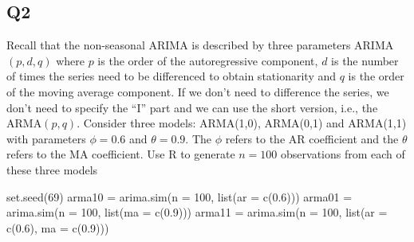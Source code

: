 \documentclass[
]{article}
\newenvironment{Shaded}{\begin{snugshade}}{\end{snugshade}}
\newcommand{\AttributeTok}[1]{\textcolor[rgb]{0.77,0.63,0.00}{#1}}
\newcommand{\DecValTok}[1]{\textcolor[rgb]{0.00,0.00,0.81}{#1}}
\newcommand{\FloatTok}[1]{\textcolor[rgb]{0.00,0.00,0.81}{#1}}
\newcommand{\FunctionTok}[1]{\textcolor[rgb]{0.00,0.00,0.00}{#1}}
\newcommand{\NormalTok}[1]{#1}
\newcommand{\OtherTok}[1]{\textcolor[rgb]{0.56,0.35,0.01}{#1}}
\begin{document}
\hypertarget{q2}{%
\subsection{Q2}\label{q2}}

Recall that the non-seasonal ARIMA is described by three parameters
ARIMA\((p,d,q)\) where \(p\) is the order of the autoregressive
component, \(d\) is the number of times the series need to be
differenced to obtain stationarity and \(q\) is the order of the moving
average component. If we don't need to difference the series, we don't
need to specify the ``I'' part and we can use the short version, i.e.,
the ARMA\((p,q)\). Consider three models: ARMA(1,0), ARMA(0,1) and
ARMA(1,1) with parameters \(\phi=0.6\) and \(\theta= 0.9\). The \(\phi\)
refers to the AR coefficient and the \(\theta\) refers to the MA
coefficient. Use R to generate \(n=100\) observations from each of these
three models

\begin{Shaded}
\begin{Highlighting}[]
\FunctionTok{set.seed}\NormalTok{(}\DecValTok{69}\NormalTok{)}
\NormalTok{arma10 }\OtherTok{=} \FunctionTok{arima.sim}\NormalTok{(}\AttributeTok{n =} \DecValTok{100}\NormalTok{, }\FunctionTok{list}\NormalTok{(}\AttributeTok{ar =} \FunctionTok{c}\NormalTok{(}\FloatTok{0.6}\NormalTok{)))}
\NormalTok{arma01 }\OtherTok{=} \FunctionTok{arima.sim}\NormalTok{(}\AttributeTok{n =} \DecValTok{100}\NormalTok{, }\FunctionTok{list}\NormalTok{(}\AttributeTok{ma =} \FunctionTok{c}\NormalTok{(}\FloatTok{0.9}\NormalTok{)))}
\NormalTok{arma11 }\OtherTok{=} \FunctionTok{arima.sim}\NormalTok{(}\AttributeTok{n =} \DecValTok{100}\NormalTok{, }\FunctionTok{list}\NormalTok{(}\AttributeTok{ar =} \FunctionTok{c}\NormalTok{(}\FloatTok{0.6}\NormalTok{), }\AttributeTok{ma =} \FunctionTok{c}\NormalTok{(}\FloatTok{0.9}\NormalTok{)))}
\end{Highlighting}
\end{Shaded}
\end{document}
